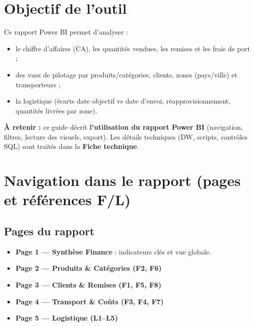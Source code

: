 \documentclass[a4paper,12pt]{article}
\begin{document}
\renewcommand{\contentsname}{Sommaire}
\tableofcontents
\newpage
{}
\setcounter{page}{1}

\section{Objectif de l’outil}
Ce rapport Power BI permet d’analyser :
\begin{itemize}[leftmargin=*]
  \item le chiffre d’affaires (CA), les quantités vendues, les remises et les frais de port ;
  \item des vues de pilotage par produits/catégories, clients, zones (pays/ville) et transporteurs ;
  \item la logistique (écarts date objectif vs date d’envoi, réapprovisionnement, quantités livrées par zone).
\end{itemize}

\begin{tipbox}
\textbf{À retenir :} ce guide décrit \textbf{l’utilisation du rapport Power BI} (navigation, filtres, lecture des visuels, export).
Les détails techniques (DW, scripts, contrôles SQL) sont traités dans la \textbf{Fiche technique}.
\end{tipbox}

\section{Navigation dans le rapport (pages et références F/L)}

\subsection{Pages du rapport}
\begin{itemize}[leftmargin=*]
  \item \textbf{Page 1 — Synthèse Finance} : indicateurs clés et vue globale.
  \item \textbf{Page 2 — Produits \& Catégories (F2, F6)}
  \item \textbf{Page 3 — Clients \& Remises (F1, F5, F8)}
  \item \textbf{Page 4 — Transport \& Coûts (F3, F4, F7)}
  \item \textbf{Page 5 — Logistique (L1–L5)}
\end{itemize}
\end{document}
